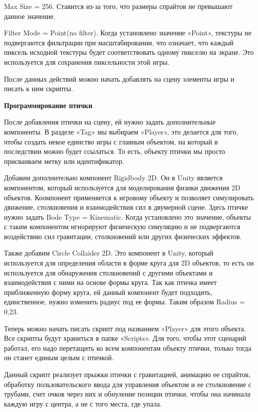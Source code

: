 \documentclass[14pt, oneside]{altsu-report}
\begin{document}
Max Size = 256. Ставится из-за того, что размеры спрайтов не превышают данное значение.

Filter Mode = Point(no filter). Когда установлено значение «Point», текстуры не подвергаются фильтрации при масштабировании, что означает, что каждый пиксель исходной текстуры будет соответствовать одному пикселю на экране. Это используется для сохранения пиксельности этой игры.

После данных действий можно начать добавлять на сцену элементы игры и писать к ним скрипты.

\textbf{Программирование птички}

После добавления птички на сцену, ей нужно задать дополнительные компоненты. В разделе «Tag» мы выбираем «Player», это делается для того, чтобы создать некое единство игры с главным объектом, на который в последствии можно будет ссылаться. То есть, объекту птички мы просто присваиваем метку или идентификатор.

Добавим дополнительно компонент Rigidbody 2D. Он в Unity является компонентом, который используется для моделирования физики движения 2D объектов. Коомпонент применяется к игровому объекту и позволяет симулировать движение, столкновения и взаимодействия сил в двумерной сцене. Здесь птичке нужно задать Bode Type = Kinematic. Когда установлено это значение, объекты с таким компонентом игнорируют физическую симуляцию и не подвергаются воздействию сил гравитации, столкновений или других физических эффектов.

Также добавим Circle Collaider 2D. Это компонент в Unity, который используется для определения области в форме круга для 2D объектов, то есть он используется для обнаружения столкновений с другими объектами и взаимодействия с ними на основе формы круга. Так как птичка имеет приближенную форму круга, ей данный компонент будет подходить, единственное, нужно изменить радиус под ее формы. Таким образом Radius = 0,23.

Теперь можно начать писать скрипт под названием «Player» для этого объекта. Все скрипты будут храниться в папке «Scripts». Для того, чтобы этот сценарий работал, его надо перетащить ко всем компонентам объекту птички, только тогда он станет единым целым с птичкой. 

Данный скрипт реализует прыжки птички с гравитацией, анимацию ее спрайтов, обработку пользовательского ввода для управления объектом и ее столкновение с трубами, счет очков через них и обнуление позиции птички, чтобы она начинала каждую игру с центра, а не с того места, где упала.
\end{document}
